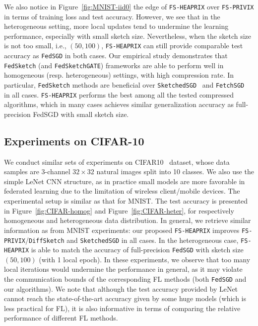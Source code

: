 \documentclass[sigconf, anonymous, review]{acmart}
\begin{document}
We also notice in Figure~\ref{fig:MNIST-iid0} the edge of \texttt{FS-HEAPRIX} over \texttt{FS-PRIVIX} in terms of training loss and test accuracy. 
However, we see that in the heterogeneous setting, more local updates tend to undermine the learning performance, especially with small sketch size.  
Nevertheless, when the sketch size is not too small, i.e., $(50,100)$, \texttt{FS-HEAPRIX} can still provide comparable test accuracy as \texttt{FedSGD} in both cases.
Our empirical study demonstrates that \texttt{FedSketch} (and \texttt{FedSketchGATE}) frameworks are able to perform well in homogeneous (resp. heterogeneous) settings, with high compression rate. 
In particular, \texttt{FedSketch} methods are beneficial over \texttt{SketchedSGD}~\citep{ivkin2019communication} and \texttt{FetchSGD}~\citep{rothchild2020fetchsgd} in all cases. 
\texttt{FS-HEAPRIX} performs the best among all the tested compressed algorithms, which in many cases achieves similar generalization accuracy as full-precision FedSGD with small sketch size. 


\subsection{Experiments on CIFAR-10}


We conduct similar sets of experiments on CIFAR10~\cite{cifar} dataset, whose data samples are 3-channel $32\times 32$ natural images split into 10 classes. We also use the simple LeNet CNN structure, as in practice small models are more favorable in federated learning due to the limitation of wireless client/mobile devices. The experimental setup is similar as that for MNIST. The test accuracy is presented in Figure~\ref{fig:CIFAR-homog} and Figure~\ref{fig:CIFAR-heter}, for respectively homogeneous and heterogeneous data distribution. In general, we retrieve similar information as from MNIST experiments: our proposed \texttt{FS-HEAPRIX} improves \texttt{FS-PRIVIX}/\texttt{DiffSketch} and \texttt{SketchedSGD} in all cases. In the heterogeneous case, \texttt{FS-HEAPRIX} is able to match the accuracy of full-precision \texttt{FedSGD} with sketch size $(50,100)$ (with 1 local epoch). In these experiments, we observe that too many local iterations would undermine the performance in general, as it may violate the communication bounds of the corresponding FL methods (both \texttt{FedSGD} and our algorithms). We note that although the test accuracy provided by LeNet cannot reach the state-of-the-art accuracy given by some huge models (which is less practical for FL), it is also informative in terms of comparing the relative performance of different FL methods.
\end{document}
